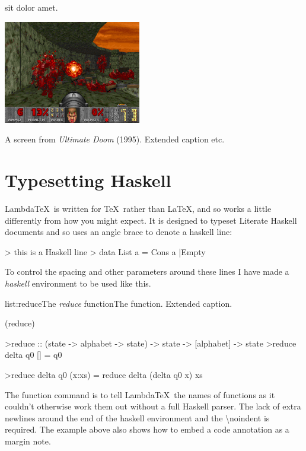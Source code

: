 
 sit dolor amet.
\lipsum[2-3]

\begin{marginfigure}
	\includegraphics[width=6cm]{res/game_screens/doom/doom.png}
	\caption[A screen from \emph{Ultimate Doom}.]{A screen from \emph{Ultimate Doom} (1995). Extended caption etc.}
	\label{fig:doom}
\end{marginfigure}

\lipsum[4]

\section{Typesetting Haskell}

Lambda\TeX\ is written for \TeX\ rather than \LaTeX, and so works a little differently from how you might expect. It is designed to typeset Literate Haskell documents and so uses an angle brace to denote a haskell line:

> this is a Haskell line
> data List a = Cons a |Empty

To control the spacing and other parameters around these lines I have made a \emph{haskell} environment to be used like this.

\vspace{-0.5em}
\begin{listing}{list:reduce}{The \emph{reduce} function}{The  function. Extended caption.}{}
\end{listing}\vspace{-1.5em}

\functions(reduce)
\begin{haskell}
>reduce :: (state -> alphabet -> state) -> state -> [alphabet] -> state
>reduce delta q0 []     = q0

\vspace{-1.7em}
>reduce delta q0 (x:xs) = reduce delta (delta q0 x) xs

\end{haskell}
\noindent
The function command is to tell Lambda\TeX\ the names of functions as it couldn't otherwise work them out without a full Haskell parser. The lack of extra newlines around the end of the haskell environment and the \textbackslash noindent is required. The example above also shows how to embed a code annotation as a margin note. 

